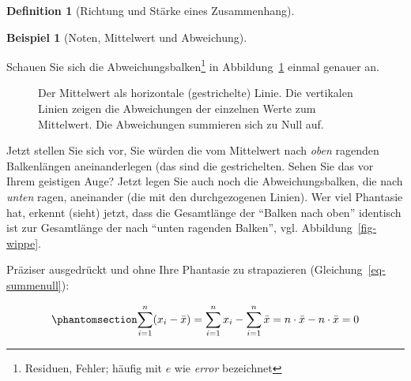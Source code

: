 \documentclass[
  a4paper,
  DIV=11]{scrreprt}
\theoremstyle{definition}
\theoremstyle{definition}
\newtheorem{example}{Beispiel}[chapter]
\theoremstyle{definition}
\newtheorem{definition}{Definition}[chapter]
\theoremstyle{remark}
\begin{document}
\begin{definition}[Richtung und Stärke eines
Zusammenhang]
\begin{example}[Noten, Mittelwert und
Abweichung]
\end{example}

Schauen Sie sich die Abweichungsbalken\footnote{Residuen, Fehler; häufig
  mit \(e\) wie \emph{error} bezeichnet} in Abbildung~\ref{fig-mw1}
einmal genauer an.

\begin{figure}


\caption{\label{fig-mw1}Der Mittelwert als horizontale (gestrichelte)
Linie. Die vertikalen Linien zeigen die Abweichungen der einzelnen Werte
zum Mittelwert. Die Abweichungen summieren sich zu Null auf.}

\end{figure}%

Jetzt stellen Sie sich vor, Sie würden die vom Mittelwert nach
\emph{oben} ragenden Balkenlängen aneinanderlegen (das sind die
gestrichelten. Sehen Sie das vor Ihrem geistigen Auge? Jetzt legen Sie
auch noch die Abweichungsbalken, die nach \emph{unten} ragen, aneinander
(die mit den durchgezogenen Linien). Wer viel Phantasie hat, erkennt
(sieht) jetzt, dass die Gesamtlänge der ``Balken nach oben'' identisch
ist zur Gesamtlänge der nach ``unten ragenden Balken'', vgl.
Abbildung~\ref{fig-wippe}.

Präziser ausgedrückt und ohne Ihre Phantasie zu strapazieren
(Gleichung~\ref{eq-summenull}):

\begin{equation}\phantomsection\label{eq-summenull}{\sum_{i=1}^n (x_i-\bar{x})=\sum_{i=1}^n x_i - \sum_{i=1}^n \bar{x} = n\cdot \bar{x} - n\cdot \bar{x}=0}\end{equation}


\end{definition}
\end{document}
